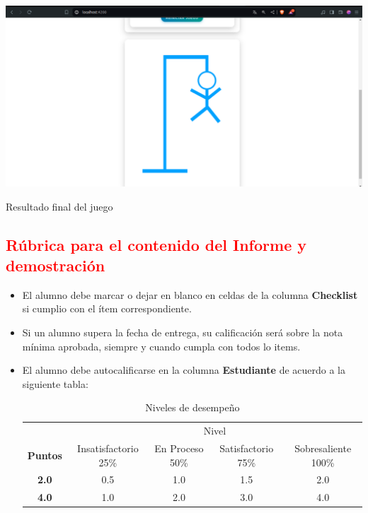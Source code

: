 \documentclass{article}
\begin{document}
    \begin{minipage}{1\textwidth}
        \centering
        \includegraphics[width=1\textwidth]{img/result3.png}
        \caption{Resultado final del juego}
        \label{fig:result3}
    \end{minipage}



\clearpage


	
\subsection{\textcolor{red}{Rúbrica para el contenido del Informe y demostración}}
	\begin{itemize}			
		\item El alumno debe marcar o dejar en blanco en celdas de la columna \textbf{Checklist} si cumplio con el ítem correspondiente.
		\item Si un alumno supera la fecha de entrega,  su calificación será sobre la nota mínima aprobada, siempre y cuando cumpla con todos lo items.
		\item El alumno debe autocalificarse en la columna \textbf{Estudiante} de acuerdo a la siguiente tabla:
	
		\begin{table}[ht]
			\caption{Niveles de desempeño}
			\begin{center}
			\begin{tabular}{ccccc}
    			\hline
    			 & \multicolumn{4}{c}{Nivel}\\
    			\cline{1-5}
    			\textbf{Puntos} & Insatisfactorio 25\%& En Proceso 50\% & Satisfactorio 75\% & Sobresaliente 100\%\\
    			\textbf{2.0}&0.5&1.0&1.5&2.0\\
    			\textbf{4.0}&1.0&2.0&3.0&4.0\\
    		\hline
			\end{tabular}
		\end{center}
	\end{table}	
	
	\end{itemize}
	
\end{document}

